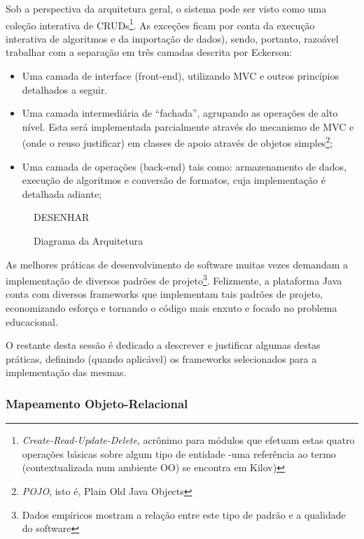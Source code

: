 \documentclass{abnt}
\begin{document}
Sob a perspectiva da arquitetura geral, o sistema pode ser visto como uma coleção interativa de CRUDs\footnote{\textit{Create-Read-Update-Delete}, acrônimo para módulos que efetuam estas quatro operações básicas sobre algum tipo de entidade -uma referência ao termo (contextualizada num ambiente OO) se encontra em Kilov\cite{kilov_crud})}. As exceções ficam por conta da execução interativa de algoritmos e da importação de dados), sendo, portanto, razoável trabalhar com a separação em três camadas descrita por Eckerson\cite{Eckerson1995}:

\begin{itemize}
\item Uma camada de interface (front-end), utilizando MVC e outros princípios detalhados a seguir.

\item Uma camada intermediária de “fachada”, agrupando as operações de alto nível. Esta será implementada parcialmente através do mecanismo de MVC e (onde o reuso justificar) em classes de apoio através de objetos simples\footnote{\textit{POJO}, isto é, Plain Old Java Objects};

\item Uma camada de operações (back-end) tais como: armazenamento de dados, execução de algoritmos e conversão de formatos, cuja implementação é detalhada adiante;


\end{itemize}

\begin{figure}[htbp]
\begin{center}
DESENHAR
\caption{Diagrama da Arquitetura}
\label{default}
\end{center}
\end{figure}


As melhores práticas de desenvolvimento de software muitas vezes demandam a implementação de diversos padrões de projeto\footnote{Dados empíricos mostram\cite{IeeeExperience} a relação entre este tipo de padrão e a qualidade do software}. Felizmente, a plataforma Java conta com diversos frameworks que implementam tais padrões de projeto, economizando esforço e tornando o código mais enxuto e focado no problema educacional.

O restante desta sessão é dedicado a descrever e justificar algumas destas práticas, definindo (quando aplicável) os frameworks selecionados para a implementação das mesmas.

\subsubsection{Mapeamento Objeto-Relacional}
\end{document}
